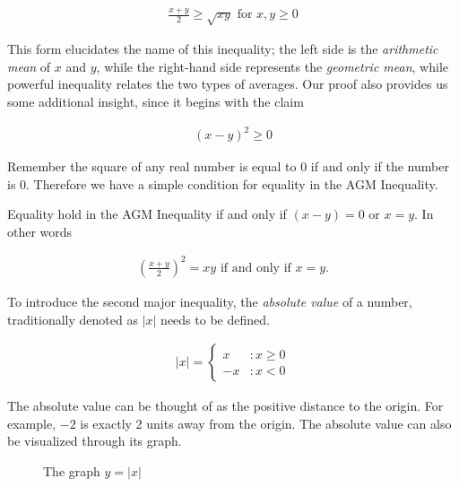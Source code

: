 \begin{align}
	\frac{x + y}{2} \ge \sqrt{xy} \text{ for } x, y \ge 0
\end{align}

This form elucidates the name of this inequality; the left side is the \emph{arithmetic mean} of $x$ and $y$, while the right-hand side represents the \emph{geometric mean}, while powerful inequality relates the two types of averages. Our proof also provides us some additional insight, since it begins with the claim

\begin{align*}
	(x - y)^2 \ge 0
\end{align*}

Remember the square of any real number is equal to 0 if and only if the number is 0. Therefore we have a simple condition for equality in the AGM Inequality.

\vspace{\baselineskip}
\begin{theorem}
	Equality hold in the AGM Inequality if and only if $(x - y) = 0$ or $x = y$. In other words
	
	\begin{align}
		\left( \frac{x + y}{2} \right)^2 = xy \text{ if and only if } x = y.
	\end{align}
\end{theorem}

To introduce the second major inequality, the \emph{absolute value} of a number, traditionally denoted as $|x|$ needs to be defined.

\begin{align*}
	|x| = \begin{cases}
		x &: x \ge 0 \\
		-x &: x < 0
	\end{cases}
\end{align*}

The absolute value can be thought of as the positive distance to the origin. For example, $-2$ is exactly 2 units away from the origin. The absolute value can also be visualized through its graph.

\begin{figure}
	\begin{center}
	\end{center}
	\caption{The graph $y = |x|$}
\end{figure}


